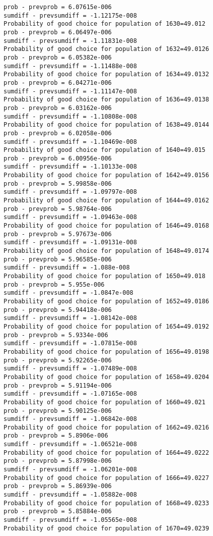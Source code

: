 \documentclass[11pt,onecolumn]{article}
\begin{document}
\begin{verbatim}
prob - prevprob = 6.07615e-006
sumdiff - prevsumdiff = -1.12175e-008
Probability of good choice for population of 1630=49.012
prob - prevprob = 6.06497e-006
sumdiff - prevsumdiff = -1.11831e-008
Probability of good choice for population of 1632=49.0126
prob - prevprob = 6.05382e-006
sumdiff - prevsumdiff = -1.11488e-008
Probability of good choice for population of 1634=49.0132
prob - prevprob = 6.04271e-006
sumdiff - prevsumdiff = -1.11147e-008
Probability of good choice for population of 1636=49.0138
prob - prevprob = 6.03162e-006
sumdiff - prevsumdiff = -1.10808e-008
Probability of good choice for population of 1638=49.0144
prob - prevprob = 6.02058e-006
sumdiff - prevsumdiff = -1.10469e-008
Probability of good choice for population of 1640=49.015
prob - prevprob = 6.00956e-006
sumdiff - prevsumdiff = -1.10133e-008
Probability of good choice for population of 1642=49.0156
prob - prevprob = 5.99858e-006
sumdiff - prevsumdiff = -1.09797e-008
Probability of good choice for population of 1644=49.0162
prob - prevprob = 5.98764e-006
sumdiff - prevsumdiff = -1.09463e-008
Probability of good choice for population of 1646=49.0168
prob - prevprob = 5.97673e-006
sumdiff - prevsumdiff = -1.09131e-008
Probability of good choice for population of 1648=49.0174
prob - prevprob = 5.96585e-006
sumdiff - prevsumdiff = -1.088e-008
Probability of good choice for population of 1650=49.018
prob - prevprob = 5.955e-006
sumdiff - prevsumdiff = -1.0847e-008
Probability of good choice for population of 1652=49.0186
prob - prevprob = 5.94418e-006
sumdiff - prevsumdiff = -1.08142e-008
Probability of good choice for population of 1654=49.0192
prob - prevprob = 5.9334e-006
sumdiff - prevsumdiff = -1.07815e-008
Probability of good choice for population of 1656=49.0198
prob - prevprob = 5.92265e-006
sumdiff - prevsumdiff = -1.07489e-008
Probability of good choice for population of 1658=49.0204
prob - prevprob = 5.91194e-006
sumdiff - prevsumdiff = -1.07165e-008
Probability of good choice for population of 1660=49.021
prob - prevprob = 5.90125e-006
sumdiff - prevsumdiff = -1.06842e-008
Probability of good choice for population of 1662=49.0216
prob - prevprob = 5.8906e-006
sumdiff - prevsumdiff = -1.06521e-008
Probability of good choice for population of 1664=49.0222
prob - prevprob = 5.87998e-006
sumdiff - prevsumdiff = -1.06201e-008
Probability of good choice for population of 1666=49.0227
prob - prevprob = 5.86939e-006
sumdiff - prevsumdiff = -1.05882e-008
Probability of good choice for population of 1668=49.0233
prob - prevprob = 5.85884e-006
sumdiff - prevsumdiff = -1.05565e-008
Probability of good choice for population of 1670=49.0239

\end{verbatim}
\end{document}
